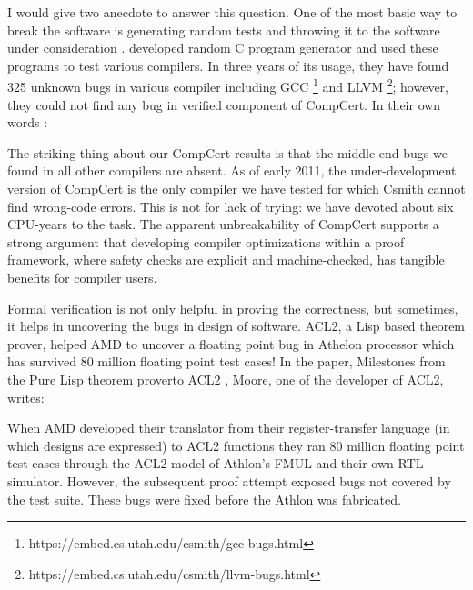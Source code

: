 	I would give two anecdote to answer this question. 
	One of the most basic way to 
	break the software is generating random tests and throwing it to 
	the software under consideration \citep{Miller:1990:ESR:96267.96279}.
	\citep{Yang:2011:FUB:1993316.1993532} developed random 
	C program generator and used these programs to test various 
	compilers. In three years of its usage, they have found 325 unknown
	bugs in various compiler including GCC
	\footnote{https://embed.cs.utah.edu/csmith/gcc-bugs.html} and LLVM
	\footnote{https://embed.cs.utah.edu/csmith/llvm-bugs.html}; however, 
	they could not find any bug in verified component of CompCert. 
	In their own words \citep{Yang:2011:FUB:1993316.1993532}:
	
	\begin{displayquote}
	
	The striking thing about our CompCert results is that the middle-end 
	bugs we found in all other compilers are absent. As of early 2011,
	the under-development version of CompCert is the only compiler we
	have tested for which Csmith cannot find wrong-code errors. This is
	not for lack of trying: we have devoted about six CPU-years to the
	task. The apparent unbreakability of CompCert supports a strong
	argument that developing compiler optimizations within a proof
	framework, where safety checks are explicit and machine-checked,
	has tangible benefits for compiler users.
	
	\end{displayquote}
	
	\noindent
	Formal verification is not only helpful in proving the correctness, 
	but sometimes, it helps in uncovering the bugs in design of
	software. ACL2, a Lisp based theorem prover, helped 
	AMD to uncover a floating point bug in Athelon processor which 
	has survived 80 million floating point test cases! 
	In the paper, Milestones from the Pure Lisp theorem proverto ACL2
	\cite{Moore2019}, Moore, one of the developer of ACL2, writes:
	
	\begin{displayquote}
	
	When AMD developed their translator 
	from their register-transfer language (in which designs
	are expressed) to ACL2 functions they ran 80 million 
	floating point test cases through the ACL2 model of 
	Athlon’s FMUL and their own RTL simulator. However, the 
	subsequent proof attempt exposed bugs not covered by the
	test suite. These bugs were fixed before the Athlon was 
	fabricated.
	
	\end{displayquote}
	
